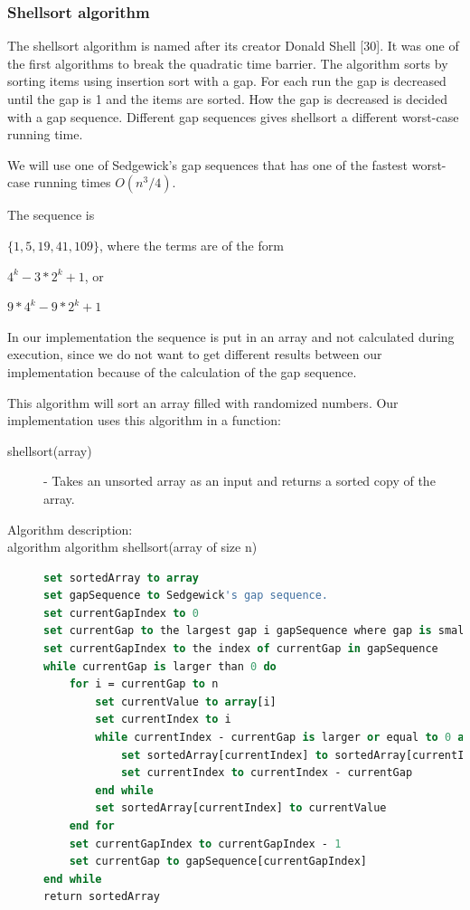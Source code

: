 \documentclass {article}
\begin{document}
\subsubsection{Shellsort algorithm}
The shellsort algorithm is named after its creator Donald Shell [30]. It was one of the first algorithms to break the quadratic time barrier. The algorithm sorts by sorting items using insertion sort with a gap. For each run the gap is decreased until the gap is 1 and the items are sorted. How the gap is decreased is decided with a gap sequence. Different gap sequences gives shellsort a different worst-case running time.
 
We will use one of Sedgewick's gap sequences that has one of the fastest worst-case running times \(O(n^3/4)\). 

The sequence is 

\(\{1, 5, 19, 41, 109\}\), where the terms are of the form

\(4^k - 3 * 2^k + 1\), or

\(9 * 4^k - 9 * 2^k + 1\)
 
In our implementation the sequence is put in an array and not calculated during execution, since we do not want to get different results between our implementation because of the calculation of the gap sequence.

This algorithm will sort an array filled with randomized numbers. Our implementation uses this algorithm in a function:

\begin{description}
\item[shellsort(array)] - Takes an unsorted array as an input and returns a sorted copy of the array.

\item[Algorithm description:]
\item[algorithm algorithm shellsort(array of size n)]
\item []
\begin{lstlisting}[language=Pascal]
set sortedArray to array
set gapSequence to Sedgewick's gap sequence.
set currentGapIndex to 0
set currentGap to the largest gap i gapSequence where gap is smaller than n divided by 2
set currentGapIndex to the index of currentGap in gapSequence
while currentGap is larger than 0 do
 	for i = currentGap to n
 		set currentValue to array[i]
 		set currentIndex to i
 		while currentIndex - currentGap is larger or equal to 0 and sortedArray[currentIndex - currentGap] is larger than currentValue do
 			set sortedArray[currentIndex] to sortedArray[currentIndex - currentGap]
 			set currentIndex to currentIndex - currentGap
 		end while
 		set sortedArray[currentIndex] to currentValue
 	end for
 	set currentGapIndex to currentGapIndex - 1
 	set currentGap to gapSequence[currentGapIndex]
end while
return sortedArray
\end{lstlisting}
\end{description}
\end{document}
